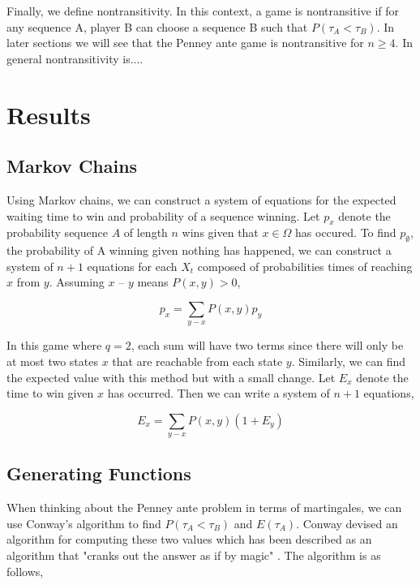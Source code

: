 \documentclass{article}
\numberwithin{mytheorem}{subsection} %
\begin{document}
		Finally, we define nontransitivity. In this context, a game is nontransitive if for any sequence A, player B can choose a sequence B such that $P(\tau_A < \tau_B)$. In later sections we will see that the Penney ante game is nontransitive for $n \geq 4$. In general nontransitivity is....

	\section{Results}
		\subsection{Markov Chains}
			Using Markov chains, we can construct a system of equations for the expected waiting time to win and probability of a sequence winning. Let $p_{x}$ denote the probability sequence $A$ of length $n$ wins given that $x\in\Omega$ has occured. To find $p_\emptyset$, the probability of A winning given nothing has happened, we can construct a system of $n+1$ equations for each $X_t$ composed of probabilities times of reaching $x$ from $y$. Assuming $x$ -- $y$ means $P(x,y) > 0$,

			$$p_x = \sum_{y - x} P(x,y) p_y$$

			In this game where $q=2$, each sum will have two terms since there will only be at most two states $x$ that are reachable from each state $y$. Similarly, we can find the expected value with this method but with a small change. Let $E_x$ denote the time to win given $x$ has occurred. Then we can write a system of $n+1$ equations,

			$$E_x = \sum_{y - x} P(x,y) (1 + E_y)$$


		\subsection{Generating Functions}
			When thinking about the Penney ante problem in terms of martingales, we can use Conway's algorithm to find $P(\tau_A < \tau_B)$ and $E(\tau_A)$. Conway devised an algorithm for computing these two values which has been described as an algorithm that "cranks out the answer as if by magic" \cite{gardner}. The algorithm is as follows,
\end{document}
